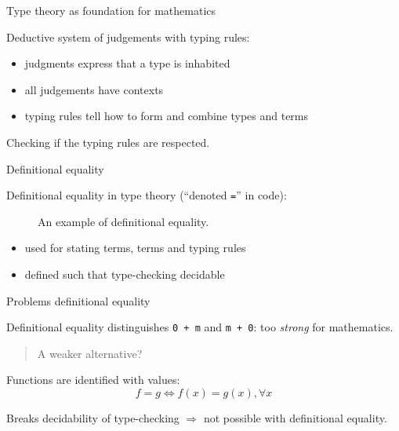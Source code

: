 \documentclass[english,handout]{beamer}
\begin{document}
\begin{frame}{Type theory as foundation for mathematics}

    Deductive system of judgements with typing rules:


    \begin{prooftree}
    \end{prooftree}

    \begin{itemize}
    \item judgments express that a type is inhabited
    \item all judgements have contexts
    \item typing rules tell how to form and combine types and terms
    \end{itemize}
    
    \begin{definition}
    Checking if the typing rules are respected.
    \end{definition}
    
\end{frame}


\begin{frame}{Definitional equality}
    
    Definitional equality in type theory (``denoted \texttt{=}'' in code):

    \begin{figure}
    
    \caption{An example of definitional equality.}
    \end{figure}

    \begin{itemize}
     \item used for stating terms, terms and typing rules
     \item defined such that type-checking decidable
    \end{itemize}
    
    
    
\end{frame}

\begin{frame}{Problems definitional equality}

Definitional equality distinguishes  \texttt{0 + m} and \texttt{m + 0}: too \emph{strong} for mathematics.

\begin{quotation}
A weaker alternative?
\end{quotation}

\begin{example}

Functions are identified with values:
     \[f = g \Leftrightarrow f(x) = g(x), \forall x \]
    
    Breaks decidability of type-checking $\Rightarrow$ not possible with definitional equality.
    \end{example}
    

    
    
\end{frame}
\end{document}
